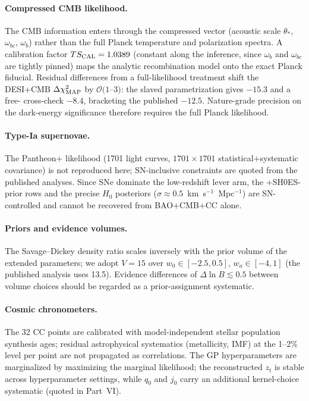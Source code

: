 \paragraph{Compressed CMB likelihood.} The CMB information enters through the
compressed vector (acoustic scale $\theta_*$, $\omega_{bc}$, $\omega_b$) rather
than the full Planck temperature and polarization spectra. A calibration factor
$TS_{\rm CAL} = 1.0389$ (constant along the inference, since $\omega_b$ and
$\omega_{bc}$ are tightly pinned) maps the analytic recombination model onto
the exact Planck fiducial. Residual differences from a full-likelihood
treatment shift the DESI+CMB $\Delta\chi^2_{\rm MAP}$ by
$\mathcal{O}(1$--$3)$: the slaved parametrization gives $-15.3$ and a free-{\Om}
cross-check $-8.4$, bracketing the published $-12.5$. Nature-grade precision on
the dark-energy significance therefore requires the full Planck likelihood.

\paragraph{Type-Ia supernovae.} The Pantheon+ likelihood (1701 light curves,
$1701\times1701$ statistical$+$systematic covariance) is not reproduced here;
SN-inclusive constraints are quoted from the published analyses. Since SNe
dominate the low-redshift lever arm, the +SH0ES-prior rows and the precise
$H_0$ posteriors ($\sigma\approx0.5$~km~s$^{-1}$~Mpc$^{-1}$) are
SN-controlled and cannot be recovered from BAO$+$CMB$+$CC alone.

\paragraph{Priors and evidence volumes.} The Savage--Dickey density ratio
scales inversely with the prior volume of the extended parameters; we adopt
$V = 15$ over $w_0\in[-2.5,0.5]$, $w_a\in[-4,1]$ (the published analysis uses
13.5). Evidence differences of $\Delta\ln B \lesssim 0.5$ between volume
choices should be regarded as a prior-assignment systematic.

\paragraph{Cosmic chronometers.} The 32 CC points are calibrated with
model-independent stellar population synthesis ages; residual astrophysical
systematics (metallicity, IMF) at the 1--2\% level per point are not propagated
as correlations. The GP hyperparameters are marginalized by maximizing the
marginal likelihood; the reconstructed $z_t$ is stable across hyperparameter
settings, while $q_0$ and $j_0$ carry an additional kernel-choice systematic
(quoted in Part~VI).

